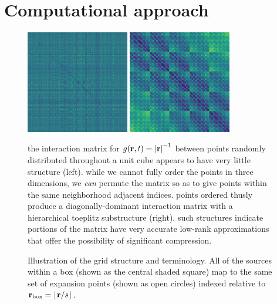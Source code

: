 \section{Computational approach}

\begin{figure}
  \centering
  \ifmakeplots
    \includegraphics[width=0.4\textwidth]{figures/dist_mat_unsorted}
    \hspace{1cm}
    \includegraphics[width=0.4\textwidth]{figures/dist_mat_sorted}
  \fi
  \caption{\label{fig:matrix structure} the interaction matrix for $g(\vb{r}, t) = \abs{\vb{r}}^{-1}$ between points randomly distributed throughout a unit cube appears to have very little structure (left).
    while we cannot fully order the points in three dimensions, we \emph{can} permute the matrix so as to give points within the same neighborhood adjacent indices.
    points ordered thusly produce a diagonally-dominant interaction matrix with a hierarchical toeplitz substructure (right).
    such structures indicate portions of the matrix have very accurate low-rank approximations that offer the possibility of significant compression.
  }
\end{figure}

\begin{figure}
  \centering
  \caption{\label{fig:aim terminology} Illustration of the grid structure and terminology.
    All of the sources within a box (shown as the central shaded square) map to the same set of expansion points (shown as open circles) indexed relative to $\vb{r}_\text{box} = \lfloor\vb{r}/s\rfloor$.
  }
\end{figure}

